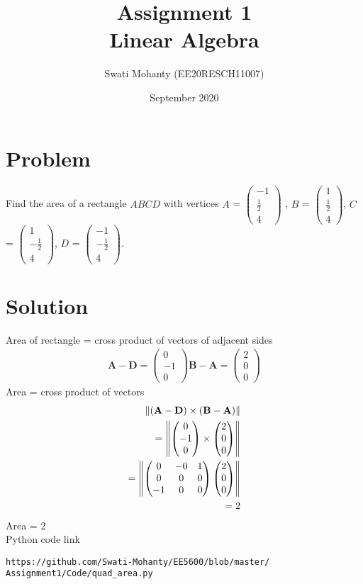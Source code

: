 \documentclass[journal,12pt,twocolumn]{IEEEtran}
\title{Assignment 1
\\Linear Algebra }
\author{Swati Mohanty (EE20RESCH11007) }
\date{September 2020}
\newcommand{\myvec}[1]{\ensuremath{\begin{pmatrix}#1\end{pmatrix}}}
\let\vec\mathbf
\begin{document}
\maketitle


\section{Problem}
Find the area of a rectangle $ABCD$ with vertices $A$ = \myvec{-1 \\\frac{1}{2} \\4} , $B$ = \myvec{1 \\\frac{1}{2} \\4}, $C$ = \myvec{1 \\-\frac{1}{2} \\4}, $D$ = \myvec{-1 \\-\frac{1}{2} \\4}.
\section{Solution}
Area of rectangle = cross product of vectors of adjacent sides
\begin{align}
    \vec{A} - \vec{D} = \myvec{0 \\-1 \\0} 
    \vec{B} -\vec{A} = \myvec{2 \\0 \\0}
\end{align}   
Area = cross product of vectors
\begin{align}
    \norm{(\vec{A}-\vec{D}) \times  (\vec{B}-\vec{A})}   
    \\=\norm{\myvec{0 \\-1 \\0}  \times \myvec{2 \\0 \\0}} 
    \\=\norm{\myvec{0&-0&1 \\0&0&0 \\-1&0&0}  \myvec{2 \\0 \\0}}
    \\= 2
\end{align}
Area = 2 
\\Python code link 
\begin{lstlisting}
https://github.com/Swati-Mohanty/EE5600/blob/master/
Assignment1/Code/quad_area.py
\end{lstlisting}
\end{document}
